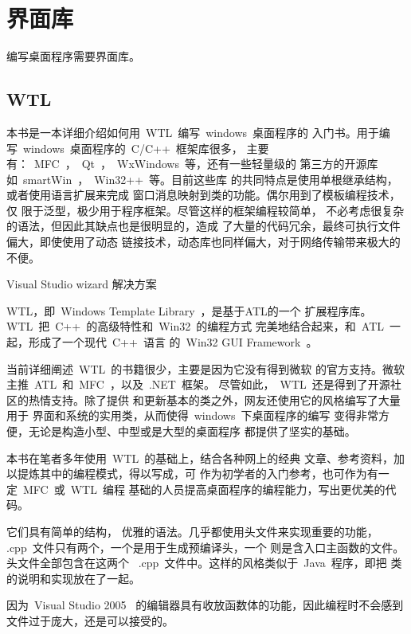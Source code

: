 ﻿%
%

\chapter{界面库}

编写桌面程序需要界面库。

\section{WTL}

本书是一本详细介绍如何用~WTL~编写~windows~桌面程序的
入门书。用于编写~windows~桌面程序的~C/C++~框架库很多，
主要有：~MFC~，~Qt~，~WxWindows~等，还有一些轻量级的
第三方的开源库如~smartWin~，~Win32++~等。目前这些库
的共同特点是使用单根继承结构，或者使用语言扩展来完成
窗口消息映射到类的功能。偶尔用到了模板编程技术，仅
限于泛型，极少用于程序框架。尽管这样的框架编程较简单，
不必考虑很复杂的语法，但因此其缺点也是很明显的，造成
了大量的代码冗余，最终可执行文件偏大，即使使用了动态
链接技术，动态库也同样偏大，对于网络传输带来极大的
不便。

Visual Studio
wizard
解决方案

WTL，即~Windows Template Library~，是基于ATL的一个
扩展程序库。WTL~把~C++~的高级特性和~Win32~的编程方式
完美地结合起来，和~ATL~一起，形成了一个现代~C++~语言
的~Win32 GUI Framework~。

当前详细阐述~WTL~的书籍很少，主要是因为它没有得到微软
的官方支持。微软主推~ATL~和~MFC~，以及~.NET~框架。
尽管如此，~WTL~还是得到了开源社区的热情支持。除了提供
和更新基本的类之外，网友还使用它的风格编写了大量用于
界面和系统的实用类，从而使得~windows~下桌面程序的编写
变得非常方便，无论是构造小型、中型或是大型的桌面程序
都提供了坚实的基础。

本书在笔者多年使用~WTL~的基础上，结合各种网上的经典
文章、参考资料，加以提炼其中的编程模式，得以写成，可
作为初学者的入门参考，也可作为有一定~MFC~或~WTL~编程
基础的人员提高桌面程序的编程能力，写出更优美的代码。

它们具有简单的结构，
优雅的语法。几乎都使用头文件来实现重要的功能，
.cpp~文件只有两个，一个是用于生成预编译头，一个
则是含入口主函数的文件。头文件全部包含在这两个
~.cpp~文件中。这样的风格类似于~Java~程序，即把
类的说明和实现放在了一起。

因为~Visual Studio 2005~
的编辑器具有收放函数体的功能，因此编程时不会感到
文件过于庞大，还是可以接受的。

